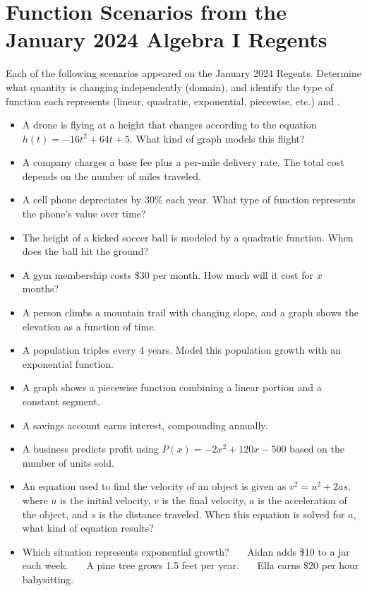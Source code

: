 \documentclass[12pt]{article}
\begin{document}
\section*{Function Scenarios from the January 2024 Algebra I Regents}

Each of the following scenarios appeared on the January 2024 Regents. Determine what quantity is changing independently (domain), and identify the type of function each represents (linear, quadratic, exponential, piecewise, etc.) and .

\begin{itemize}
  \item A drone is flying at a height that changes according to the equation $h(t) = -16t^2 + 64t + 5$. What kind of graph models this flight?
  \item A company charges a base fee plus a per-mile delivery rate. The total cost depends on the number of miles traveled.
  \item A cell phone depreciates by 30\% each year. What type of function represents the phone's value over time?
  \item The height of a kicked soccer ball is modeled by a quadratic function. When does the ball hit the ground?
  \item A gym membership costs \$30 per month. How much will it cost for $x$ months?
  \item A person climbs a mountain trail with changing slope, and a graph shows the elevation as a function of time.
  \item A population triples every 4 years. Model this population growth with an exponential function.
  \item A graph shows a piecewise function combining a linear portion and a constant segment.
  \item A savings account earns interest, compounding annually.
  \item A business predicts profit using $P(x) = -2x^2 + 120x - 500$ based on the number of units sold.
  \item An equation used to find the velocity of an object is given as $v^2 = u^2 + 2as$, where $u$ is the initial velocity, $v$ is the final velocity, $a$ is the acceleration of the object, and $s$ is the distance traveled. When this equation is solved for $a$, what kind of equation results?
  \item Which situation represents exponential growth? 
  \ \ \ Aidan adds \$10 to a jar each week. 
  \ \ \ A pine tree grows 1.5 feet per year. 
  \ \ \ Ella earns \$20 per hour babysitting. 

\end{itemize}
\end{document}
